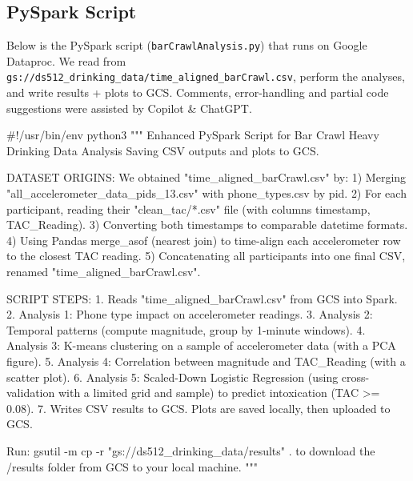 \documentclass[
  letterpaper,
  DIV=11,
  numbers=noendperiod]{scrartcl}
\newenvironment{Shaded}{\begin{snugshade}}{\end{snugshade}}
\newcommand{\CommentTok}[1]{\textcolor[rgb]{0.42,0.45,0.49}{#1}}
\begin{document}
\subsection{PySpark Script}\label{pyspark-script}

Below is the PySpark script (\texttt{barCrawlAnalysis.py}) that runs on
Google Dataproc. We read from
\texttt{gs://ds512\_drinking\_data/time\_aligned\_barCrawl.csv}, perform
the analyses, and write results + plots to GCS. Comments, error-handling
and partial code suggestions were assisted by Copilot \& ChatGPT.

\begin{Shaded}
\begin{Highlighting}[]
\CommentTok{\#!/usr/bin/env python3}
\CommentTok{"""}
\CommentTok{Enhanced PySpark Script for Bar Crawl Heavy Drinking Data Analysis}
\CommentTok{Saving CSV outputs and plots to GCS.}

\CommentTok{DATASET ORIGINS:}
\CommentTok{    We obtained "time\_aligned\_barCrawl.csv" by:}
\CommentTok{      1) Merging "all\_accelerometer\_data\_pids\_13.csv" with phone\_types.csv by pid.}
\CommentTok{      2) For each participant, reading their "clean\_tac/*.csv" file (with columns timestamp, TAC\_Reading).}
\CommentTok{      3) Converting both timestamps to comparable datetime formats.}
\CommentTok{      4) Using Pandas\textquotesingle{} merge\_asof (nearest join) to time{-}align each accelerometer row to the closest TAC reading.}
\CommentTok{      5) Concatenating all participants into one final CSV, renamed "time\_aligned\_barCrawl.csv".}

\CommentTok{SCRIPT STEPS:}
\CommentTok{    1. Reads "time\_aligned\_barCrawl.csv" from GCS into Spark.}
\CommentTok{    2. Analysis 1: Phone type impact on accelerometer readings.}
\CommentTok{    3. Analysis 2: Temporal patterns (compute magnitude, group by 1{-}minute windows).}
\CommentTok{    4. Analysis 3: K{-}means clustering on a sample of accelerometer data (with a PCA figure).}
\CommentTok{    5. Analysis 4: Correlation between magnitude and TAC\_Reading (with a scatter plot).}
\CommentTok{    6. Analysis 5: Scaled{-}Down Logistic Regression (using cross{-}validation with a limited grid and sample)}
\CommentTok{       to predict intoxication (TAC \textgreater{}= 0.08).}
\CommentTok{    7. Writes CSV results to GCS. Plots are saved locally, then uploaded to GCS.}

\CommentTok{Run:}
\CommentTok{  gsutil {-}m cp {-}r "gs://ds512\_drinking\_data/results" .}
\CommentTok{to download the /results folder from GCS to your local machine.}
\CommentTok{"""}


\end{Highlighting}
\end{Shaded}
\end{document}
